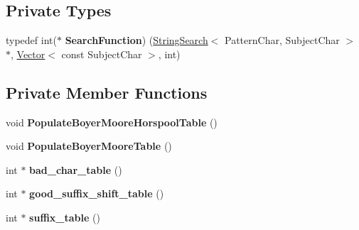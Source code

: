 \subsection*{Private Types}
\begin{DoxyCompactItemize}
\item 
typedef int($\ast$ {\bfseries Search\+Function}) (\hyperlink{classv8_1_1internal_1_1_string_search}{String\+Search}$<$ Pattern\+Char, Subject\+Char $>$ $\ast$, \hyperlink{classv8_1_1internal_1_1_vector}{Vector}$<$ const Subject\+Char $>$, int)\hypertarget{classv8_1_1internal_1_1_string_search_adc3739f42f1b6081ca82a0b9c1351503}{}\label{classv8_1_1internal_1_1_string_search_adc3739f42f1b6081ca82a0b9c1351503}

\end{DoxyCompactItemize}
\subsection*{Private Member Functions}
\begin{DoxyCompactItemize}
\item 
void {\bfseries Populate\+Boyer\+Moore\+Horspool\+Table} ()\hypertarget{classv8_1_1internal_1_1_string_search_aba7644461df3d733585aba84ea49ee36}{}\label{classv8_1_1internal_1_1_string_search_aba7644461df3d733585aba84ea49ee36}

\item 
void {\bfseries Populate\+Boyer\+Moore\+Table} ()\hypertarget{classv8_1_1internal_1_1_string_search_a267bfecba4dba183834807c4c9e8af61}{}\label{classv8_1_1internal_1_1_string_search_a267bfecba4dba183834807c4c9e8af61}

\item 
int $\ast$ {\bfseries bad\+\_\+char\+\_\+table} ()\hypertarget{classv8_1_1internal_1_1_string_search_aa6621440f74f89006eabcc28d8783be3}{}\label{classv8_1_1internal_1_1_string_search_aa6621440f74f89006eabcc28d8783be3}

\item 
int $\ast$ {\bfseries good\+\_\+suffix\+\_\+shift\+\_\+table} ()\hypertarget{classv8_1_1internal_1_1_string_search_a114ed6ff8fd55fd2b0436e0a02e4be7c}{}\label{classv8_1_1internal_1_1_string_search_a114ed6ff8fd55fd2b0436e0a02e4be7c}

\item 
int $\ast$ {\bfseries suffix\+\_\+table} ()\hypertarget{classv8_1_1internal_1_1_string_search_ab42d986785dfbec839e91958736340ef}{}\label{classv8_1_1internal_1_1_string_search_ab42d986785dfbec839e91958736340ef}

\end{DoxyCompactItemize}
